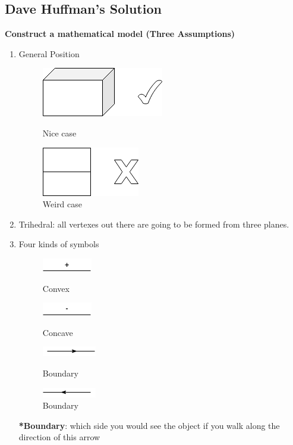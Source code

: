 \documentclass[12pt]{book}
\begin{document}
\subsection{Dave Huffman's Solution}
\textbf{Construct a mathematical model (Three Assumptions)}
\begin{enumerate}
	\item General Position
	\begin{figure}[htbp]
		\centering
		\begin{minipage}[t]{0.48\textwidth}
			\centering
			\includegraphics[]{Figure/Figure7_7.png}
			\caption{Nice case}
		\end{minipage}
		\begin{minipage}[t]{0.48\textwidth}
			\centering
			\includegraphics[]{Figure/Figure7_8.png}
			\caption{Weird case}
		\end{minipage}
	\end{figure}
	\item Trihedral:  all vertexes out there are going to be formed from three planes.
	\item Four kinds of symbols
		\begin{figure}[htbp]
		\centering
		\begin{minipage}[t]{0.23\textwidth}
			\centering
			\includegraphics[]{Figure/Figure7_9.png}
			\caption{Convex}
		\end{minipage}
		\begin{minipage}[t]{0.23\textwidth}
			\centering
			\includegraphics[]{Figure/Figure7_10.png}
			\caption{Concave}
		\end{minipage}
		\begin{minipage}[t]{0.23\textwidth}
			\centering
			\includegraphics[]{Figure/Figure7_11.png}
			\caption{Boundary}
		\end{minipage}
		\begin{minipage}[t]{0.23\textwidth}
			\centering
			\includegraphics[]{Figure/Figure7_12.png}
			\caption{Boundary}
		\end{minipage}
	\end{figure}
	\newline
	\textbf{*Boundary}: which side you would see the object if you walk along the direction of this arrow
\end{enumerate}
\end{document}
